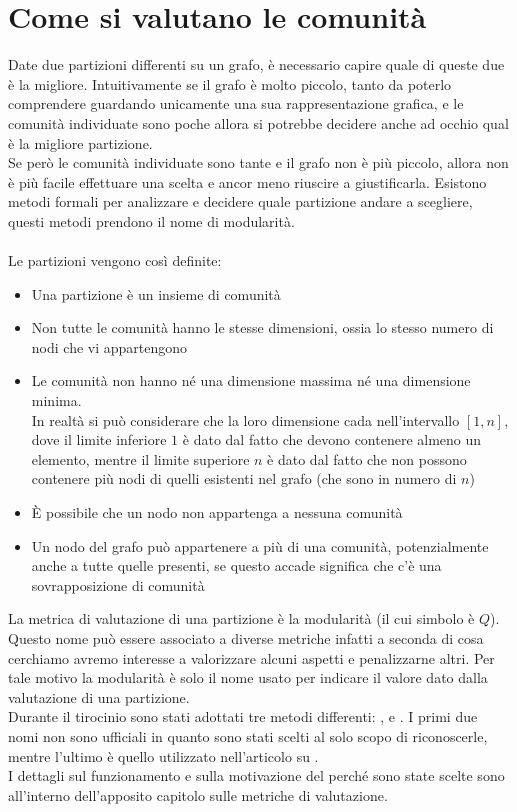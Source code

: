 \section{Come si valutano le comunità}
Date due partizioni differenti su un grafo, è necessario capire quale di queste due è la migliore. Intuitivamente se il grafo è molto piccolo, tanto da poterlo comprendere guardando unicamente una sua rappresentazione grafica, e le comunità individuate sono poche allora si potrebbe decidere anche ad occhio qual è la migliore partizione.\\
Se però le comunità individuate sono tante e il grafo non è più piccolo, allora non è più facile effettuare una scelta e ancor meno riuscire a giustificarla. Esistono metodi formali per analizzare e decidere quale partizione andare a scegliere, questi metodi prendono il nome di modularità.\\
\\
Le partizioni vengono così definite:
\begin{itemize}
	\item Una partizione è un insieme di comunità
	\item Non tutte le comunità hanno le stesse dimensioni, ossia lo stesso numero di nodi che vi appartengono
	\item Le comunità non hanno né una dimensione massima né una dimensione minima.\\
	In realtà si può considerare che la loro dimensione cada nell'intervallo $[1, n]$, dove il limite inferiore $1$ è dato dal fatto che devono contenere almeno un elemento, mentre il limite superiore $n$ è dato dal fatto che non possono contenere più nodi di quelli esistenti nel grafo (che sono in numero di $n$)
	\item È possibile che un nodo non appartenga a nessuna comunità
	\item Un nodo del grafo può appartenere a più di una comunità, potenzialmente anche a tutte quelle presenti, se questo accade significa che c'è una sovrapposizione di comunità
\end{itemize}
La metrica di valutazione di una partizione è la modularità (il cui simbolo è $Q$). Questo nome può essere associato a diverse metriche infatti a seconda di cosa cerchiamo avremo interesse a valorizzare alcuni aspetti e penalizzarne altri. Per tale motivo la modularità è solo il nome usato per indicare il valore dato dalla valutazione di una partizione.\\
Durante il tirocinio sono stati adottati tre metodi differenti: \mmax, \mover e \mmod. I primi due nomi non sono ufficiali in quanto sono stati scelti al solo scopo di riconoscerle, mentre l'ultimo \mmod è quello utilizzato nell'articolo su \cnrl \cite{CNRL_paper}.\\
I dettagli sul funzionamento e sulla motivazione del perché sono state scelte sono all'interno dell'apposito capitolo sulle metriche di valutazione.
%
